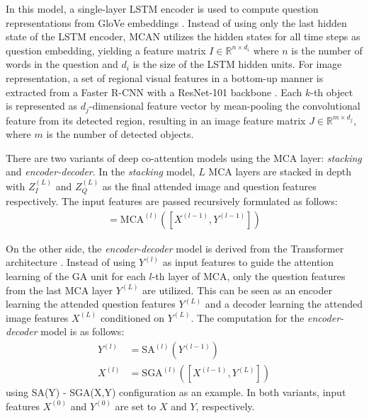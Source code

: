 \documentclass{article}
\begin{document}
In this model, a single-layer LSTM encoder \citep{lstm} is used to compute question representations from GloVe embeddings \citep{pennington2014glove}. Instead of using only the last hidden state of the LSTM encoder, MCAN utilizes the hidden states for all time steps as question embedding, yielding a feature matrix $I \in \mathbb{R}^{n \times d_{i}}$ where $n$ is the number of words in the question and $d_{i}$ is the size of the LSTM hidden units. For image representation, a set of regional visual features in a bottom-up manner \citep{Anderson_2018_CVPR} is extracted from a Faster R-CNN \citep{faster_rcnn} with a ResNet-101 backbone \citep{residual}. Each $k$-th object is represented as $d_{j}$-dimensional feature vector by mean-pooling the convolutional feature from its detected region, resulting in an image feature matrix $J \in \mathbb{R}^{m \times d_{j}}$, where $m$ is the number of detected objects.

There are two variants of deep co-attention models using the MCA layer: \textit{stacking} and \textit{encoder-decoder}. In the \textit{stacking} model, $L$ MCA layers are stacked in depth with $Z_{I}^{(L)}$ and $Z_{Q}^{(L)}$ as the final attended image and question features respectively. The input features are passed recursively formulated as follows:
\begin{align}
    [X^{(l)}, Y^{(l)}] = \text{MCA}^{(l)}([X^{(l-1)}, Y^{(l-1)}])
\end{align}

On the other side, the \textit{encoder-decoder} model is derived from the Transformer architecture \citep{transformers}. Instead of using $Y^{(l)}$ as input features to guide the attention learning of the GA unit for each $l$-th layer of MCA, only the question features from the last MCA layer $Y^{(L)}$ are utilized. This can be seen as an encoder learning the attended question features $Y^{(L)}$ and a decoder learning the attended image features $X^{(L)}$ conditioned on $Y^{(L)}$. The computation for the \textit{encoder-decoder} model is as follows:
\begin{align}
    Y^{(l)} &= \text{SA}^{(l)}(Y^{(l-1)}) \\
    X^{(l)} &= \text{SGA}^{(l)}([X^{(l-1)}, Y^{(L)}])
\end{align}
using SA(Y) - SGA(X,Y) configuration as an example. In both variants, input features $X^{(0)}$ and $Y^{(0)} $ are set to $X$ and $Y$, respectively.
\end{document}
